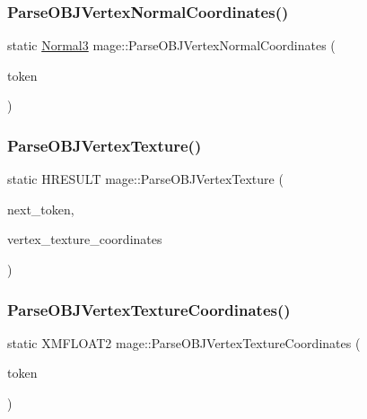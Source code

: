 \hypertarget{namespacemage_ae0f7057c0ee72cda02b499c9d4647be0}{}\label{namespacemage_ae0f7057c0ee72cda02b499c9d4647be0} 
\subsubsection{\texorpdfstring{Parse\+O\+B\+J\+Vertex\+Normal\+Coordinates()}{ParseOBJVertexNormalCoordinates()}}
{\footnotesize\ttfamily static \hyperlink{structmage_1_1_normal3}{Normal3} mage\+::\+Parse\+O\+B\+J\+Vertex\+Normal\+Coordinates (\begin{DoxyParamCaption}\item[{const char $\ast$}]{token }\end{DoxyParamCaption})\hspace{0.3cm}{\ttfamily [static]}}

\hypertarget{namespacemage_a8ffd4094ac940ff129fccb6d77c1f353}{}\label{namespacemage_a8ffd4094ac940ff129fccb6d77c1f353} 
\subsubsection{\texorpdfstring{Parse\+O\+B\+J\+Vertex\+Texture()}{ParseOBJVertexTexture()}}
{\footnotesize\ttfamily static H\+R\+E\+S\+U\+LT mage\+::\+Parse\+O\+B\+J\+Vertex\+Texture (\begin{DoxyParamCaption}\item[{char $\ast$$\ast$}]{next\+\_\+token,  }\item[{vector$<$ X\+M\+F\+L\+O\+A\+T2 $>$ \&}]{vertex\+\_\+texture\+\_\+coordinates }\end{DoxyParamCaption})\hspace{0.3cm}{\ttfamily [static]}}

\hypertarget{namespacemage_a97780c7deeb5a5923b0d6665732e132d}{}\label{namespacemage_a97780c7deeb5a5923b0d6665732e132d} 
\subsubsection{\texorpdfstring{Parse\+O\+B\+J\+Vertex\+Texture\+Coordinates()}{ParseOBJVertexTextureCoordinates()}}
{\footnotesize\ttfamily static X\+M\+F\+L\+O\+A\+T2 mage\+::\+Parse\+O\+B\+J\+Vertex\+Texture\+Coordinates (\begin{DoxyParamCaption}\item[{const char $\ast$}]{token }\end{DoxyParamCaption})\hspace{0.3cm}{\ttfamily [static]}}

